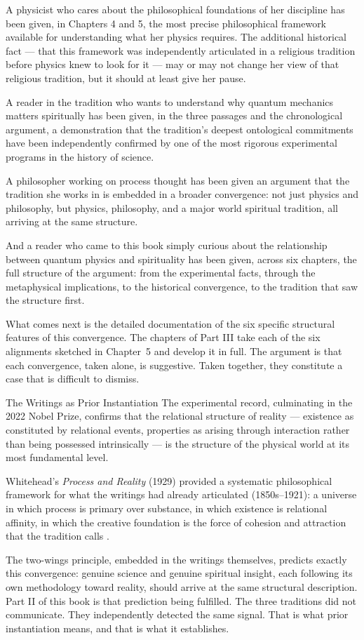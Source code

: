 A physicist who cares about the philosophical foundations of her discipline has
been given, in Chapters 4 and 5, the most precise philosophical framework
available for understanding what her physics requires.
The additional historical fact --- that this framework was independently articulated
in a religious tradition before physics knew to look for it --- may or may not
change her view of that religious tradition, but it should at least give her pause.

A reader in the \bahai tradition who wants to understand why quantum mechanics
matters spiritually has been given, in the three passages and the chronological
argument, a demonstration that the tradition's deepest ontological commitments
have been independently confirmed by one of the most rigorous experimental
programs in the history of science.

A philosopher working on process thought has been given an argument that the
tradition she works in is embedded in a broader convergence: not just physics
and philosophy, but physics, philosophy, and a major world spiritual tradition,
all arriving at the same structure.

And a reader who came to this book simply curious about the relationship between
quantum physics and spirituality has been given, across six chapters, the full
structure of the argument: from the experimental facts, through the metaphysical
implications, to the historical convergence, to the tradition that saw the
structure first.

What comes next is the detailed documentation of the six specific structural
features of this convergence.
The chapters of Part III take each of the six alignments sketched in Chapter~5
and develop it in full.
The argument is that each convergence, taken alone, is suggestive.
Taken together, they constitute a case that is difficult to dismiss.


\begin{convergencemoment}{The Writings as Prior Instantiation}
The experimental record, culminating in the 2022 Nobel Prize, confirms that the
relational structure of reality --- existence as constituted by relational events,
properties as arising through interaction rather than being possessed intrinsically
--- is the structure of the physical world at its most fundamental level.

Whitehead's \textit{Process and Reality} (1929) provided a systematic
philosophical framework for what the \bahai writings had already articulated
(1850s--1921): a universe in which process is primary over substance, in which
existence is relational affinity, in which the creative foundation is the force
of cohesion and attraction that the tradition calls \mahabbat.

The two-wings principle, embedded in the \bahai writings themselves, predicts
exactly this convergence: genuine science and genuine spiritual insight, each
following its own methodology toward reality, should arrive at the same structural
description.
Part II of this book is that prediction being fulfilled.
The three traditions did not communicate.
They independently detected the same signal.
That is what prior instantiation means, and that is what it establishes.
\end{convergencemoment}
